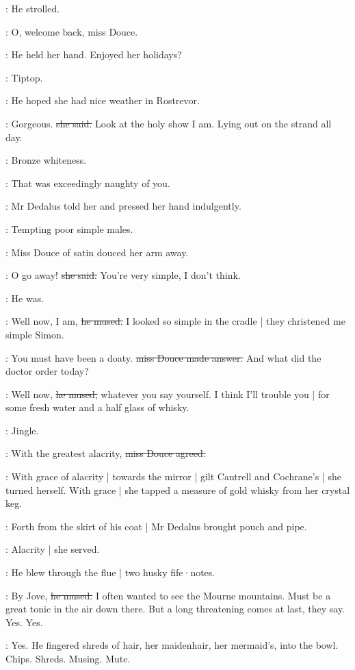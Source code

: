 :
He strolled.

\simon:
O,
welcome back,
miss Douce.

:
He held her hand.
Enjoyed her holidays?

\MissD:
Tiptop.

:
He hoped she had nice weather in Rostrevor.

\MissD:
Gorgeous.
\sout{she said.}
Look at the holy show I am.
Lying out on the strand
all day.

:
Bronze whiteness.

\simon:
That was exceedingly naughty of you.

:
Mr Dedalus told her and pressed her hand indulgently.

\simon:
Tempting poor simple males.

:
Miss Douce of satin douced her arm away.

\MissD:
O go away!
\sout{she said.}
You're very simple,
I don't think.

:
He was.

\simon:
Well now,
I am,
\sout{he mused.}
I looked so simple in the cradle |
they christened me simple Simon.

\MissD:
You must have been a doaty.
\sout{miss Douce made answer.}
And what did the doctor order today?

\simon:
Well now,
\sout{he mused,}
whatever you say yourself.
I think I'll trouble you |
for some fresh water
and a half glass of whisky.

:
Jingle.

\MissD:
With the greatest alacrity,
\sout{miss Douce agreed.}

:
With grace of alacrity |
towards the mirror |
gilt Cantrell and Cochrane's |
she turned herself.
With grace |
she tapped a measure of gold whisky
from her crystal keg.

:
Forth from the skirt of his coat |
Mr Dedalus brought pouch and pipe.

:
Alacrity |
she served.

:
He blew through the flue |
two husky fife·notes.

\simon:
By Jove,
\sout{he mused.}
I often wanted to see the Mourne mountains.
Must be a great tonic in the air down there.
But a long threatening comes at last,
they say.
Yes.
Yes.

:
Yes.
He fingered shreds of hair,
her maidenhair,
her mermaid's,
into the bowl.
Chips.
Shreds.
Musing.
Mute.

